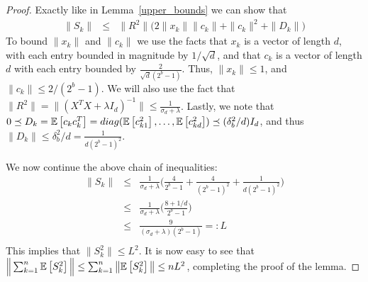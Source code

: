 \documentclass[12pt]{article}
\newcommand{\eqdef}{=:}
\begin{document}
	\begin{proof}
Exactly like in Lemma~\ref{upper_bounds} we can show that
		\begin{eqnarray*}
			\|S_k\| &\leq& \|R^2\|\Big(2\|x_k\|\|c_k\| + \|c_k\|^2 + \|D_k\|\Big) 
		\end{eqnarray*}
		To bound $\|x_k\|$ and $\|c_k\|$ we use the facts that $x_k$ is a vector of length $d$, with each entry bounded in magnitude by $1/\sqrt{d}$, and that $c_k$ is a vector of length $d$ with each entry bounded by $\frac{2}{\sqrt{d}(2^b-1)}$.  Thus, $\|x_k\| \leq 1$, and $\|c_k\| \leq 2/(2^b-1)$.  We will also use the fact that $\|R^2\| = \|(X^T X +\lambda I_d)^{-1}\| \leq \frac{1}{\sigma_d + \lambda}$. Lastly, we note that $0 \preceq D_k = \expect{}{c_k c_k^T} = diag(\expect{}{c_{k1}^2},\ldots,\expect{}{c_{kd}^2}) \preceq (\delta_b^2/d) I_d$, and thus $\|D_k\| \leq \delta_b^2/d = \frac{1}{d(2^b-1)^2}$.
		
		We now continue the above chain of inequalities:
		\begin{eqnarray*}
			\|S_k\| &\leq&\frac{1}{\sigma_d + \lambda}\Big(\frac{4}{2^b-1} + \frac{4}{(2^b-1)^2} + \frac{1}{d(2^b-1)^2}\Big)\\
			&\leq&\frac{1}{\sigma_d + \lambda}\Big(\frac{8 + 1/d}{2^b-1}\Big)\\
			&\leq&\frac{9}{(\sigma_d + \lambda)(2^b-1)} \eqdef L\\
		\end{eqnarray*}
		This implies that $\|S_k^2\| \leq L^2$.  It is now easy to see that 
		$\Big\|\sum_{k=1}^n \expect{}{S_k^2}\Big\| \leq \sum_{k=1}^n \big\|\expect{}{S_k^2}\big\| \leq nL^2$, completing the proof of the lemma.
	\end{proof}
\end{document}
